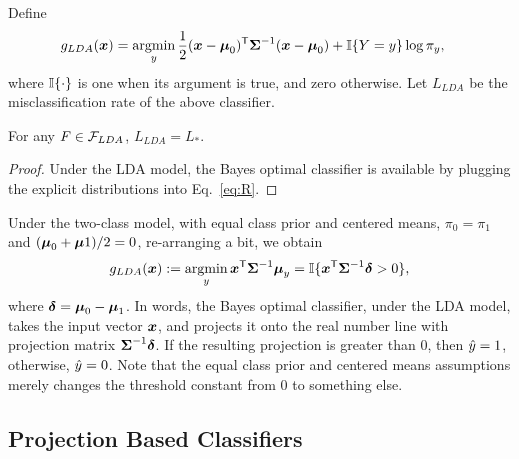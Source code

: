 \documentclass[10pt]{article}
\begin{document}
Define
\begin{align*}
g_{LDA}(\bx)&=\argmin_y \frac{1}{2} (\bx-\bmu_0)\T \bSig^{-1}(\bx-\bmu_0) + \II\{Y=y\}  \log \pi_y,
\end{align*}  
where $\mathbb{I}\{ \cdot\}$ is one when its argument is true, and zero otherwise.
Let $L_{LDA}$ be the misclassification rate of the above classifier.

\begin{lem}
For any $F \in \mathcal{F}_{LDA}$, $L_{LDA}=L_*$.
\end{lem}

\begin{proof}
Under the LDA model,  the Bayes optimal classifier is available by plugging the explicit distributions into Eq.~\eqref{eq:R}.
\end{proof}

Under the two-class model, with equal class prior and centered means,  $\pi_0=\pi_1$ and $(\boldsymbol{\mu}_0+\boldsymbol{\mu}1)/2=0$, re-arranging a bit, we obtain
\begin{align*}
g_{LDA}(\bx) :=  \argmin_y \bx\T \bSig^{-1} \bmu_y = \II\{ \bx\T \bSig^{-1} \bdel > 0 \},
\end{align*}
where $\boldsymbol{\delta}=\boldsymbol{\mu}_0-\boldsymbol{\mu}_1$. In words, the Bayes optimal classifier, under the LDA model, takes the input vector $\boldsymbol{x}$, and projects it onto the real number line with projection matrix $\boldsymbol{\Sigma}^{-1} \boldsymbol{\delta}$.  If the resulting projection is greater than $0$, then $\hat{y}=1$, otherwise, $\hat{y}=0$.  Note that the equal class prior and centered means assumptions merely changes the threshold constant from $0$ to something else.  




\subsection{Projection Based Classifiers}
\end{document}
